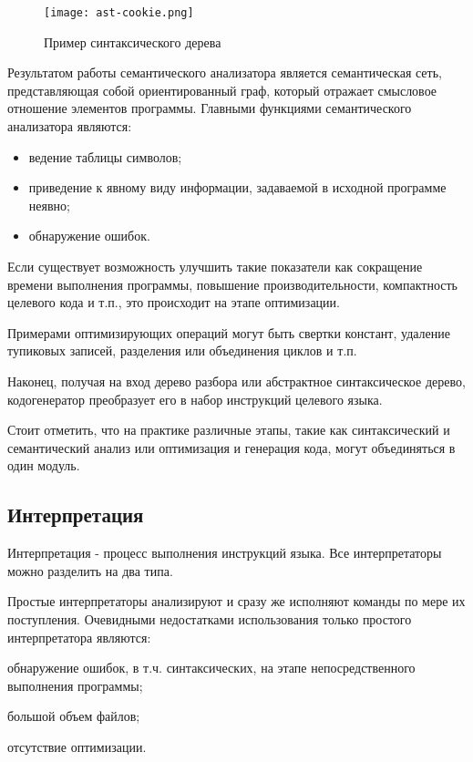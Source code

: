 \begin{figure}[htbp]
	\centering
	\texttt{[image: ast-cookie.png]}
	\caption{Пример синтаксического дерева}%
	\label{fig:ast}
\end{figure}

Результатом работы семантического анализатора является семантическая сеть, представляющая собой ориентированный граф, который отражает смысловое отношение элементов программы. Главными функциями семантического анализатора являются:

\begin{itemize}
	\item ведение таблицы символов;
	\item приведение к явному виду информации, задаваемой в исходной программе неявно;
	\item обнаружение ошибок.
\end{itemize}

Если существует возможность улучшить такие показатели как сокращение времени выполнения программы, повышение производительности, компактность целевого кода и т.п., это происходит на этапе оптимизации.

Примерами оптимизирующих операций могут быть свертки констант, удаление тупиковых записей, разделения или объединения циклов и т.п.

Наконец, получая на вход дерево разбора или абстрактное синтаксическое дерево, кодогенератор преобразует его в набор инструкций целевого языка.

Стоит отметить, что на практике различные этапы, такие как синтаксический и семантический анализ или оптимизация и генерация кода, могут объединяться в один модуль.

\subsection{Интерпретация}

Интерпретация - процесс выполнения инструкций языка. Все интерпретаторы можно разделить на два типа.

Простые интерпретаторы анализируют и сразу же исполняют команды по мере их поступления. Очевидными недостатками использования только простого интерпретатора являются:
\begin{itemize*}
	\item обнаружение ошибок, в т.ч. синтаксических, на этапе непосредственного выполнения программы;
	\item большой объем файлов;
	\item отсутствие оптимизации.
\end{itemize*}

